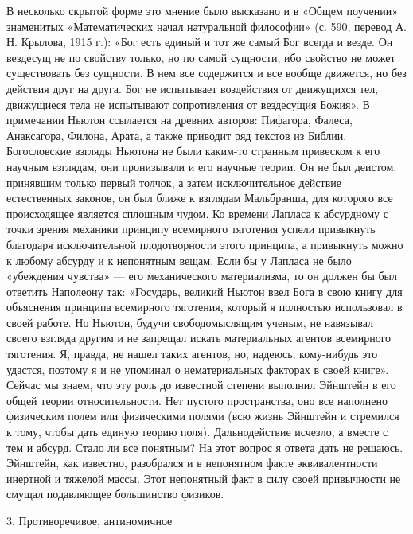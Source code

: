 В  несколько  скрытой форме  это  мнение  было  высказано и  в  «Общем
поучении»  знаменитых  «Математических  начал  натуральной  философии»
(с.  590,  перевод  А.  Н.  Крылова, 1915  г.):  «Бог  есть  единый  и
тот  же  самый  Бог  всегда  и  везде.  Он  вездесущ  не  по  свойству
только, но по  самой сущности, ибо свойство не  может существовать без
сущности. В нем все содержится и  все вообще движется, но без действия
друг  на  друга. Бог  не  испытывает  воздействия от  движущихся  тел,
движущиеся тела  не испытывают  сопротивления от вездесущия  Божия». В
примечании  Ньютон ссылается  на  древних  авторов: Пифагора,  Фалеса,
Анаксагора, Филона,  Арата, а  также приводит  ряд текстов  из Библии.
Богословские взгляды Ньютона не были каким-то странным привеском к его
научным  взглядам, они  пронизывали и  его научные  теории. Он  не был
деистом,  принявшим  только  первый  толчок,  а  затем  исключительное
действие  естественных законов,  он был  ближе к  взглядам Мальбранша,
для  которого все  происходящее  является сплошным  чудом. Ко  времени
Лапласа  к  абсурдному с  точки  зрения  механики принципу  всемирного
тяготения  успели привыкнуть  благодаря исключительной  плодотворности
этого принципа,  а привыкнуть  можно к любому  абсурду и  к непонятным
вещам.  Если  бы  у  Лапласа  не  было  «убеждения  чувства»  ---  его
механического  материализма, то  он должен  бы был  ответить Наполеону
так: «Государь, великий  Ньютон ввел Бога в свою  книгу для объяснения
принципа всемирного тяготения, который я полностью использовал в своей
работе. Но Ньютон, будучи  свободомыслящим ученым, не навязывал своего
взгляда другим  и не  запрещал искать материальных  агентов всемирного
тяготения. Я, правда, не нашел таких агентов, но, надеюсь, кому-нибудь
это удастся, поэтому я и не упоминал о нематериальных факторах в своей
книге». Сейчас  мы знаем, что  эту роль до известной  степени выполнил
Эйнштейн в его общей теории относительности. Нет пустого пространства,
оно  все  наполнено  физическим  полем  или  физическими  полями  (всю
жизнь Эйнштейн  и стремился  к тому, чтобы  дать единую  теорию поля).
Дальнодействие  исчезло,  а  вместе  с  тем и  абсурд.  Стало  ли  все
понятным?  На этот  вопрос я  ответа  дать не  решаюсь. Эйнштейн,  как
известно, разобрался  и в непонятном факте  эквивалентности инертной и
тяжелой массы. Этот непонятный факт в силу своей привычности не смущал
подавляющее большинство физиков.

3. Противоречивое, антиномичное

